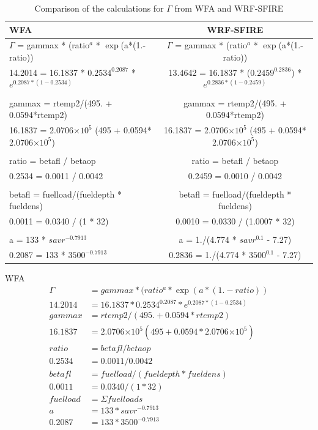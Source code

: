\documentclass{article}
\newcommand\tenpow[1]{\ensuremath{{\times}10^{#1}}}
\begin{document}
\begin{table}[h!]
  \begin{center}
    \caption{Comparison of the calculations for $\Gamma$ from WFA and WRF-SFIRE}
    \label{tab:gamma}
    \begin{tabular}{l|c} %
      \textbf{WFA} & \textbf{WRF-SFIRE}\\
      \hline
      $\Gamma$ = gammax * (ratio$^a$ * $\exp$(a*(1.-ratio)) & $\Gamma$ = gammax * (ratio$^a$ * $\exp$(a*(1.-ratio)) \\

      14.2014 = 16.1837 * $0.2534 ^ {0.2087}$ * $e^{0.2087 * (1 - 0.2534)}$ & 13.4642 = 16.1837 * ($0.2459 ^ {0.2836}$) * $e^{0.2836 * (1- 0.2459)}$ \\
      \\
      gammax = rtemp2/(495. + 0.0594*rtemp2) & gammax = rtemp2/(495. + 0.0594*rtemp2) \\
      16.1837 = 2.0706\tenpow{5} (495 + 0.0594* 2.0706\tenpow{5}) & 16.1837 = 2.0706\tenpow{5} (495 + 0.0594* 2.0706\tenpow{5}) \\
\\
	  ratio = betafl / betaop & ratio = betafl / betaop \\
	  0.2534 = 0.0011 / 0.0042 & 0.2459 = 0.0010 / 0.0042 \\
	  \\
	  betafl = fuelload/(fueldepth * fueldens) & betafl = fuelload/(fueldepth * fueldens) \\
	  0.0011 = 0.0340 / (1 * 32) & 0.0010 = 0.0330 / (1.0007 * 32) \\
	  \\
	  a = 133 * $savr ^ {-0.7913}$ & a = 1./(4.774 * $savr^{0.1}$ - 7.27) \\
	  0.2087 = 133 * $3500^{-0.7913}$ & 0.2836 = 1./(4.774 * $3500^{0.1}$ - 7.27)
    \end{tabular}
  \end{center}
\end{table}

\iffalse

WFA
\begin{equation}
	\label{gamma_WFA}
	\begin{split}
		\Gamma &= gammax*(ratio^a * \exp(a*(1.-ratio)) \\
		14.2014 &= 16.1837 * 0.2534 ^ {0.2087} * e^{0.2087 * (1 - 0.2534)} \\
		gammax &= rtemp2/(495. + 0.0594*rtemp2) \\
		16.1837 &= 2.0706\tenpow{5} (495 + 0.0594* 2.0706\tenpow{5}) \\
		ratio &= betafl/betaop \\
		0.2534 &= 0.0011 / 0.0042 \\
		betafl &= fuelload/(fueldepth * fueldens) \\
		0.0011 &= 0.0340 / (1 * 32) \\
		fuelload &= \Sigma fuelloads \\ 
	    a &= 133 * savr ^ {-0.7913} \\
		0.2087 &= 133 * 3500^{-0.7913} 
	\end{split}
\end{equation}
\end{document}
